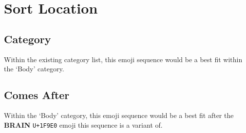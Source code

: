\section{Sort Location}

\subsection{Category}

Within the existing category list, this emoji sequence would be a best fit within the
`Body' category.

\subsection{Comes After}

Within the `Body' category, this emoji sequence would be a best fit after the
\textbf{BRAIN} \texttt{U+1F9E0} emoji this sequence is a variant of.
